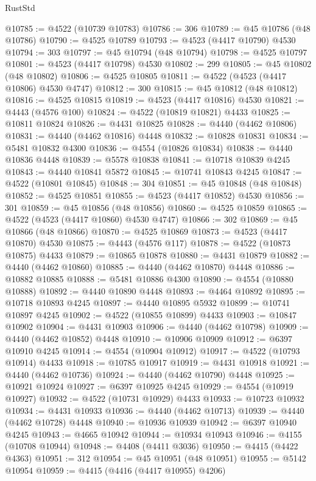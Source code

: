 \begin{lexlean}{RustStd}
\begin{coremodule}
@10785 := @4522 (@10739 @10783)
@10786 := 306
@10789 := @45 @10786 (@48 @10786)
@10790 := @4525 @10789
@10793 := @4523 (@4417 @10790) @4530
@10794 := 303
@10797 := @45 @10794 (@48 @10794)
@10798 := @4525 @10797
@10801 := @4523 (@4417 @10798) @4530
@10802 := 299
@10805 := @45 @10802 (@48 @10802)
@10806 := @4525 @10805
@10811 := @4522 (@4523 (@4417 @10806) @4530 @4747)
@10812 := 300
@10815 := @45 @10812 (@48 @10812)
@10816 := @4525 @10815
@10819 := @4523 (@4417 @10816) @4530
@10821 := @4443 (@4576 @100)
@10824 := @4522 (@10819 @10821) @4433
@10825 := @10811 @10824
@10826 := @4431 @10825
@10828 := @4440 (@4462 @10806)
@10831 := @4440 (@4462 @10816) @4448
@10832 := @10828 @10831
@10834 := @5481 @10832 @4300
@10836 := @4554 (@10826 @10834)
@10838 := @4440 @10836 @4448
@10839 := @5578 @10838
@10841 := @10718 @10839 @4245
@10843 := @4440 @10841 @5872
@10845 := @10741 @10843 @4245
@10847 := @4522 (@10801 @10845)
@10848 := 304
@10851 := @45 @10848 (@48 @10848)
@10852 := @4525 @10851
@10855 := @4523 (@4417 @10852) @4530
@10856 := 301
@10859 := @45 @10856 (@48 @10856)
@10860 := @4525 @10859
@10865 := @4522 (@4523 (@4417 @10860) @4530 @4747)
@10866 := 302
@10869 := @45 @10866 (@48 @10866)
@10870 := @4525 @10869
@10873 := @4523 (@4417 @10870) @4530
@10875 := @4443 (@4576 @117)
@10878 := @4522 (@10873 @10875) @4433
@10879 := @10865 @10878
@10880 := @4431 @10879
@10882 := @4440 (@4462 @10860)
@10885 := @4440 (@4462 @10870) @4448
@10886 := @10882 @10885
@10888 := @5481 @10886 @4300
@10890 := @4554 (@10880 @10888)
@10892 := @4440 @10890 @4448
@10893 := @4464 @10892
@10895 := @10718 @10893 @4245
@10897 := @4440 @10895 @5932
@10899 := @10741 @10897 @4245
@10902 := @4522 (@10855 @10899) @4433
@10903 := @10847 @10902
@10904 := @4431 @10903
@10906 := @4440 (@4462 @10798)
@10909 := @4440 (@4462 @10852) @4448
@10910 := @10906 @10909
@10912 := @6397 @10910 @4245
@10914 := @4554 (@10904 @10912)
@10917 := @4522 (@10793 @10914) @4433
@10918 := @10785 @10917
@10919 := @4431 @10918
@10921 := @4440 (@4462 @10736)
@10924 := @4440 (@4462 @10790) @4448
@10925 := @10921 @10924
@10927 := @6397 @10925 @4245
@10929 := @4554 (@10919 @10927)
@10932 := @4522 (@10731 @10929) @4433
@10933 := @10723 @10932
@10934 := @4431 @10933
@10936 := @4440 (@4462 @10713)
@10939 := @4440 (@4462 @10728) @4448
@10940 := @10936 @10939
@10942 := @6397 @10940 @4245
@10943 := @4665 @10942
@10944 := @10934 @10943
@10946 := @4155 (@10708 @10944)
@10948 := @4408 (@4411 @3036)
@10950 := @4415 (@4422 @4363)
@10951 := 312
@10954 := @45 @10951 (@48 @10951)
@10955 := @5142 @10954
@10959 := @4415 (@4416 (@4417 @10955) @4206)

\end{coremodule}
\end{lexlean}
